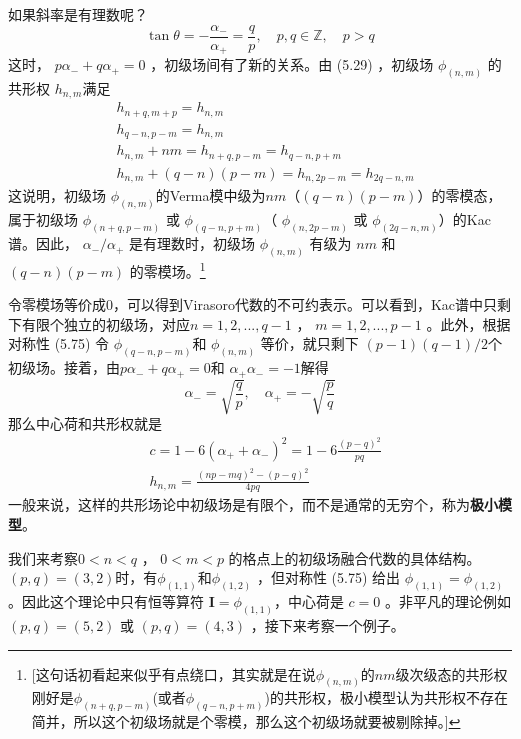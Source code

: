 如果斜率是有理数呢？
\begin{equation}
\tan \theta=-\frac{\alpha_{-}}{\alpha_{+}}=\frac{q}{p}, \quad p, q \in \mathbb{Z}, \quad p>q
\end{equation}
这时， $p \alpha_{-}+q \alpha_{+}=0$ ，初级场间有了新的关系。由 (5.29) ，初级场 $\phi_{(n, m)}$ 的共形权 $h_{n,m} $满足
\begin{align} &h_{n+q, m+p}=h_{n, m}\\ &h_{q-n, p-m}=h_{n, m} \\ &h_{n, m}+n m=h_{n+q, p-m}=h_{q-n, p+m} \\ &h_{n, m}+(q-n)(p-m)=h_{n, 2 p-m}=h_{2 q-n, m} \end{align}
这说明，初级场 $\phi_{(n, m)} $的Verma模中级为$ nm$（$(q-n)(p-m)$）的零模态，属于初级场 $\phi_{(n+q, p-m)}$ 或 $\phi_{(q-n, p+m)}$（ $\phi_{(n, 2p-m)}$ 或 $\phi_{(2q-n, m)}$）的Kac谱。因此， $\alpha_-/\alpha_+$ 是有理数时，初级场 $\phi_{(n, m)}$ 有级为 $nm$ 和 $(q-n)(p-m)$ 的零模场。\footnote{[这句话初看起来似乎有点绕口，其实就是在说$\phi_{(n,m)}$的$nm$级次级态的共形权刚好是$\phi_{(n+q,p-m)}$(或者$\phi_{(q-n,p+m)}$)的共形权，极小模型认为共形权不存在简并，所以这个初级场就是个零模，那么这个初级场就要被剔除掉。]}

令零模场等价成$0$，可以得到Virasoro代数的不可约表示。可以看到，Kac谱中只剩下有限个独立的初级场，对应$ n=1,2,...,q-1$ ， $m=1,2,...,p-1$ 。此外，根据对称性 (5.75) 令 $\phi_{(q-n, p-m)} $和 $\phi_{(n, m)}$ 等价，就只剩下 $(p-1)(q-1)/2 $个初级场。接着，由$ p \alpha_{-}+q \alpha_{+}=0 $和 $\alpha_{+} \alpha_{-}=-1 $解得
\begin{equation}
	\alpha_{-}=\sqrt{\frac{q}{p}}, \quad \alpha_{+}=-\sqrt{\frac{p}{q}}
\end{equation}
那么中心荷和共形权就是
\begin{align} &c=1-6\left(\alpha_{+}+\alpha_{-}\right)^{2}=1-6 \frac{(p-q)^{2}}{p q} \\ &h_{n, m}=\frac{(n p-m q)^{2}-(p-q)^{2}}{4 p q} \end{align}
一般来说，这样的共形场论中初级场是有限个，而不是通常的无穷个，称为\textbf{极小模型}。

我们来考察$ 0<n<q$ ， $0<m<p$ 的格点上的初级场融合代数的具体结构。 $(p,q)=(3,2) $时，有$ \phi_{(1,1)} $和$ \phi_{(1,2)}$ ，但对称性 (5.75) 给出 $\phi_{(1,1)}=\phi_{(1,2)} $。因此这个理论中只有恒等算符 $\boldsymbol{I}=\phi_{(1,1)} $，中心荷是 $c=0$ 。非平凡的理论例如 $(p,q)=(5,2)$ 或 $(p,q)=(4,3)$ ，接下来考察一个例子。

